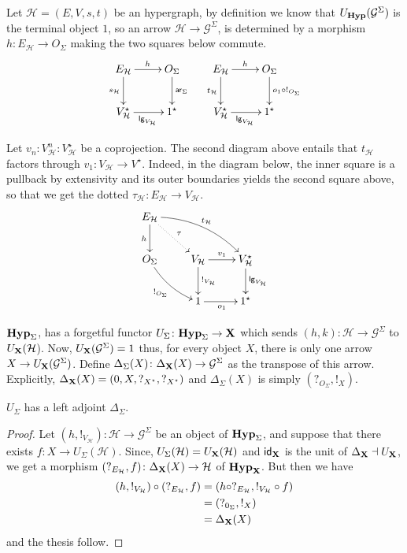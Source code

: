 \documentclass[runningheads,envcountsect]{llncs}
\newcommand{\lgh}{\mathsf{lg}}
\def\X{\textbf {\textup{X}}}
\newcommand{\catname}[1]{\textbf{\textup{#1}}}
\newcommand{\hyp}{\catname{Hyp}}
\newcommand{\ari}{\mathsf{ar}}
\newcommand{\id}[1]{\mathsf{id}_{#1}}
\begin{document}
\begin{remark}\label{rem:label}	
	Let $\mathcal{H}=(E, V, s, t)$ be an hypergraph, by definition we know that $U_{\hyp}(\mathcal{G}^{\Sigma})$ is the terminal object $1$, so an arrow $\mathcal{H}\rightarrow \mathcal{G}^{\Sigma}$, is determined by a morphism $h\colon E_\mathcal{H}\to O_\Sigma$  making the two squares below commute.
	\[\xymatrix{E_{\mathcal{H}} \ar[r]^{h} \ar[d]_{s_{\mathcal{H}}}& O_\Sigma \ar[d]^{\ari_\Sigma}& E_{\mathcal{H}} \ar[r]^{h} \ar[d]_{t_{\mathcal{H}}} & O_\Sigma \ar[d]^{o_1\circ !_{O_\Sigma}}\\ V^\star_{\mathcal{{H}}} \ar[r]_{\lgh_{V_{\mathcal{H}}}}& 1^\star & V^\star_{\mathcal{{H}}} \ar[r]_{\lgh_{V_{\mathcal{H}}}} & 1^\star}\]
	
	Let $v_n\colon V^n_\mathcal{H}\colon  V^\star_{\mathcal{H}}$ be a coprojection.  The second diagram above entails that $t_{\mathcal{H}}$ factors through $v_1\colon V_{\mathcal{H}}\to V^{\star}$. Indeed, in the diagram below, the inner square is a pullback by extensivity and its outer boundaries yields the second square above, so that we get the dotted $\tau_{\mathcal{H}}\colon E_{\mathcal{H}}\to V_{\mathcal{H}}$.
	\[\xymatrix{E_{\mathcal{H}} \ar@{.>}[dr]^{\tau}\ar@/^.4cm/[drr]^{t_{\mathcal{H}}} \ar[d]_{h} \\	O_\Sigma \ar@/_.2cm/[dr]_{!_{O_\Sigma}}&V_{\mathcal{H}} \ar[r]^{v_1}\ar[d]^{!_{V_\mathcal{H}}}& V^\star_{\mathcal{H}} \ar[d]^{\lgh_{V_{\mathcal{H}}}}\\ & 1 \ar[r]_{o_1}& 1^\star}\]
\end{remark}

$\hyp_{\Sigma}$, has a forgetful functor $U_{\Sigma}\colon \hyp_{\Sigma}\to \X$ which sends $(h,k)\colon \mathcal{H}\to \mathcal{G}^{\Sigma}$ to $U_{\X}(\mathcal{H}$). Now, $U_{\X}(\mathcal{G}^{\Sigma})=1$ thus, for every object $X$, there is only one arrow $X\to U_{\X}(\mathcal{G}^{\Sigma})$. Define $\Delta_{\Sigma}(X)\colon \Delta_{\X}(X)\to \mathcal{G}^{\Sigma}$ as the transpose of this arrow. Explicitly, $\Delta_{\X}(X)=(0, X, ?_{X^\star}, ?_{X^\star})$ and $\Delta_\Sigma(X)$ is simply $(?_{O_\Sigma}, !_{X})$.

\begin{proposition} $U_\Sigma$
	has a left adjoint $\Delta_\Sigma$.
\end{proposition}
\begin{proof}Let $(h, !_{V_\mathcal{H}})\colon \mathcal{H}\to \mathcal{G}^{\Sigma}$ be an object of $\hyp_{\Sigma}$, and suppose that there exists $f\colon X\to U_{\Sigma}(\mathcal{H})$. Since, $U_{\Sigma}(\mathcal{H})=U_{\X}(\mathcal{H})$ and $\id{\X}$ is the unit of $\Delta_\X \dashv U_{\X}$, we get a morphism $(?_{E_{\mathcal{H}}},f)\colon \Delta_{\X}(X)\to \mathcal{H}$ of $\hyp_\X$. But then we have
	\begin{align*}
		(h, !_{V_{\mathcal{{H}}}})\circ (?_{E_{\mathcal{H}}}, f)&=(h\circ ?_{E_{\mathcal{H}}}, !_{V_{\mathcal{{H}}}}\circ f)\\&=(?_{0_{\Sigma}}, !_{X})\\&=\Delta_{\X}(X)
	\end{align*}
and the thesis follow.
\end{proof}
\end{document}
